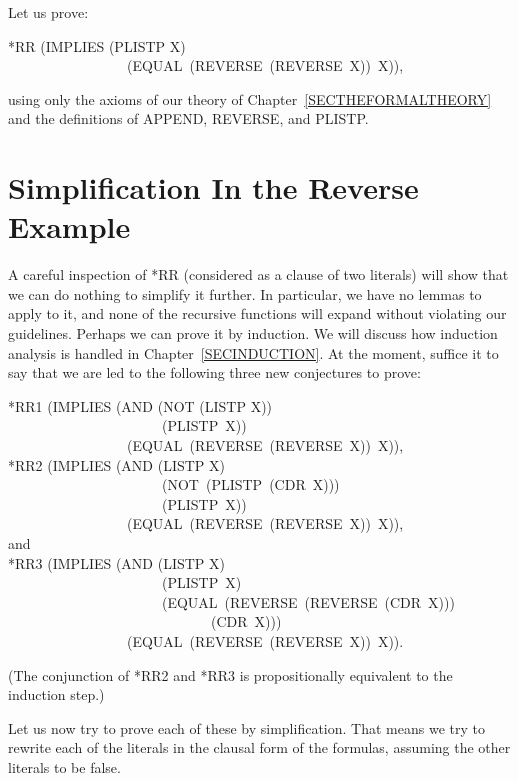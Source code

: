 \documentclass[10pt]{book}
\newenvironment{pubasis}{\begin{flushleft}}{\end{flushleft}}
\begin{document}
Let us prove:
\begin{pubasis}
*RR	(IMPLIES (PLISTP X)\\
~~~~~~~~~~~~~~~~~(EQUAL~(REVERSE~(REVERSE~X))~X)),\\
\end{pubasis}
using only the axioms of our theory of Chapter~\ref{SECTHEFORMALTHEORY}
and the definitions of APPEND, REVERSE, and PLISTP.

\section{Simplification In the Reverse Example}
A careful inspection of *RR (considered as a clause of two
literals) will show that we can do nothing to
simplify it further.  In particular, we have no lemmas to apply to it,
and none of the recursive functions will expand without violating our
guidelines.  Perhaps we can prove it by
induction.  We will discuss how induction analysis
is handled in Chapter~\ref{SECINDUCTION}.
At the moment, suffice it to say that 
we are led to the following three new conjectures to prove:

\begin{pubasis}
*RR1	(IMPLIES (AND (NOT (LISTP X))\\
~~~~~~~~~~~~~~~~~~~~~~(PLISTP~X))\\
~~~~~~~~~~~~~~~~~(EQUAL~(REVERSE~(REVERSE~X))~X)),\\

*RR2	(IMPLIES (AND (LISTP X)\\
~~~~~~~~~~~~~~~~~~~~~~(NOT~(PLISTP~(CDR~X)))\\
~~~~~~~~~~~~~~~~~~~~~~(PLISTP~X))\\
~~~~~~~~~~~~~~~~~(EQUAL~(REVERSE~(REVERSE~X))~X)),\\

and\\

*RR3	(IMPLIES (AND (LISTP X)\\
~~~~~~~~~~~~~~~~~~~~~~(PLISTP~X)\\
~~~~~~~~~~~~~~~~~~~~~~(EQUAL~(REVERSE~(REVERSE~(CDR~X)))\\
~~~~~~~~~~~~~~~~~~~~~~~~~~~~~(CDR~X)))\\
~~~~~~~~~~~~~~~~~(EQUAL~(REVERSE~(REVERSE~X))~X)).\\
\end{pubasis}
(The conjunction of *RR2 and *RR3 is propositionally equivalent to
the induction step.)

Let us now try to prove each of these by simplification.
That means we try to rewrite each of the literals in the clausal form
of the formulas, assuming the other literals to be false.
\end{document}
